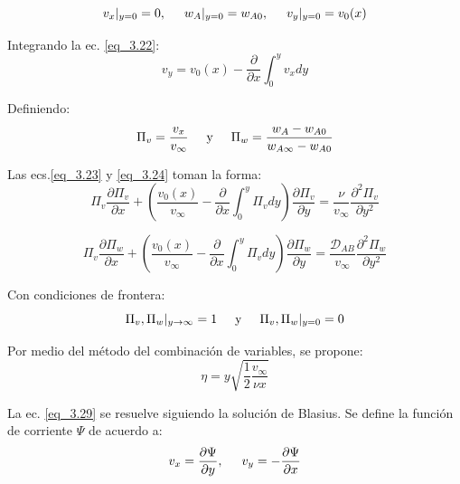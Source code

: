 \begin{equation}
v_x |_{y =0} = 0, \hspace{0.5cm} w_A|_{y=0}=w_{A0}, \hspace{0.5 cm} v_y|_{y=0} = v_0 (x)
	\label{eq_3.26}
\end{equation}

Integrando la ec. \eqref{eq_3.22}:
\begin{equation}
v_y = v_0(x) - \frac{\partial}{\partial x} \int_0^y v_x dy
	\label{eq_3.27}
\end{equation}

Definiendo:
\begin{equation}
	\Pi_v = \frac{v_x}{v_\infty} \hspace{0.5cm} \text{y} \hspace{0.5cm} \Pi_w = \frac{w_A - w_{A0}}{w_{A\infty}-w_{A0}}
	\label{eq_3.28}
\end{equation}

Las ecs.\eqref{eq_3.23} y \eqref{eq_3.24} toman la forma:
\begin{equation}
	\Pi_v \frac{\partial \Pi_v}{\partial x} + \left( \frac{v_0(x)}{v_\infty} - \frac{\partial}{\partial x} \int_0^y \Pi_v dy \right)\frac{\partial \Pi_v}{\partial y} = \frac{\nu}{v_\infty} \frac{\partial^2 \Pi_v}{\partial y^2}
	\label{eq_3.29}
\end{equation}

\begin{equation}
	\Pi_v \frac{\partial \Pi_w}{\partial x} + \left( \frac{v_0(x)}{v_\infty} - \frac{\partial}{\partial x} \int_0^y \Pi_v dy \right)\frac{\partial \Pi_w}{\partial y} = \frac{\mathscr{D}_{AB}}{v_\infty} \frac{\partial^2 \Pi_w}{\partial y^2}
	\label{eq_3.30}
\end{equation}

Con condiciones de frontera:
\begin{equation}
	\Pi_v, \Pi_w |_{y \to \infty} = 1 \hspace{0.5cm} \text{y} \hspace{0.5cm} \Pi_v, \Pi_w |_{y = 0} = 0
	\label{eq_3.31}
\end{equation}

Por medio del método del combinación de variables, se propone:
\begin{equation}
	\eta = y \sqrt{\frac{1}{2} \frac{v_\infty}{\nu x}}
	\label{eq_3.32}
\end{equation}

La ec. \eqref{eq_3.29} se resuelve siguiendo la solución de Blasius. Se define la función de corriente $\Psi$ de acuerdo a: 
\begin{equation}
	v_x = \frac{\partial \Psi}{\partial y}, \hspace{0.5cm} v_y = - \frac{\partial \Psi}{\partial x}
	\label{eq_3.33}
\end{equation}

